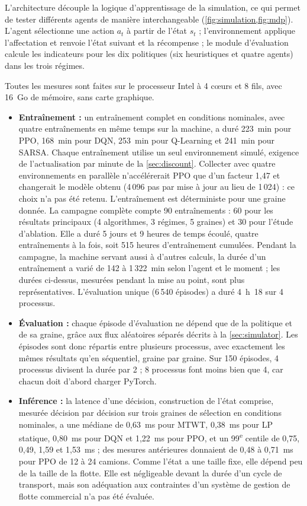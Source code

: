 \documentclass[11pt,a4paper]{article}
\newif\ifrevmarks
\newcommand{\revtag}[1]{\ifrevmarks\textsuperscript{\textcolor{red!70!black}{\scriptsize[#1]}}\fi}
\newcommand{\rev}[2]{\ifrevmarks{\color{revcolor}#2}\revtag{#1}\else#2\fi}
\newenvironment{revbloc}[1]{\par\ifrevmarks\color{revcolor}\noindent\revtag{#1}\ \fi}{\par}
\newif\ifcorrmarks
\newcommand{\corr}[1]{\ifcorrmarks\textcolor{corrcolor}{#1}\else#1\fi}
\begin{document}
L'architecture découple la logique d'apprentissage de la simulation, ce qui permet de tester différents agents de manière interchangeable (\cref{fig:simulation,fig:mdp}). L'agent sélectionne une action $a_t$ à partir de l'état $s_t$ ; l'environnement applique l'affectation et renvoie l'état suivant et la récompense ; le module d'évaluation calcule les indicateurs pour \rev{v3}{les dix politiques (six heuristiques et quatre agents)} dans les trois régimes.

\begin{revbloc}{M28, m20, m24, v3}
Toutes les mesures sont faites sur le \corr{processeur Intel à 4 cœurs et 8 fils, avec 16~Go de mémoire}, sans carte graphique.
\begin{itemize}
  \item \textbf{Entraînement :} un entraînement complet en conditions nominales, avec quatre entraînements en même temps sur la machine, a duré 223~min pour PPO, 168~min pour DQN, 253~min pour Q-Learning et 241~min pour SARSA. Chaque entraînement utilise un seul environnement simulé, exigence de l'actualisation par minute de la \cref{sec:discount}. Collecter avec quatre environnements en parallèle n'accélérerait PPO que d'un facteur 1,47 et changerait le modèle obtenu (4\,096 pas par mise à jour au lieu de 1\,024) : ce choix n'a pas été retenu. L'entraînement est déterministe pour une graine donnée. \rev{T31}{La campagne complète compte 90 entraînements : 60 pour les résultats principaux (4 algorithmes, 3 régimes, 5 graines) et 30 pour l'étude d'ablation. Elle a duré \corr{5 jours et 9 heures de temps écoulé}, quatre entraînements à la fois, soit 515 heures d'entraînement cumulées. Pendant la campagne, la machine servant aussi à d'autres calculs, la durée d'un entraînement a varié de 142 à 1\,322~min selon l'agent et le moment ; les durées ci-dessus, mesurées pendant la mise au point, sont plus représentatives. L'évaluation unique (6\,540 épisodes) a duré 4~h~18 sur 4 processus.}
  \item \textbf{Évaluation :} chaque épisode d'évaluation ne dépend que de la politique et de sa graine, grâce aux flux aléatoires séparés décrits à la \cref{sec:simulator}. Les épisodes sont donc répartis entre plusieurs processus, avec exactement les mêmes résultats qu'en séquentiel, graine par graine. Sur 150 épisodes, 4 processus divisent la durée par 2 ; 8 processus font moins bien que 4, car chacun doit d'abord charger PyTorch.
  \item \textbf{Inférence :} \corr{la latence d'une décision, construction de l'état comprise, mesurée décision par décision sur trois graines de sélection en conditions nominales, a une médiane de 0,63~ms pour MTWT, 0,38~ms pour \corr{LP statique}, 0,80~ms pour DQN et 1,22~ms pour PPO, et un 99\textsuperscript{e} centile de 0,75, 0,49, 1,59 et 1,53~ms ; des mesures antérieures donnaient de 0,48 à 0,71~ms pour PPO de 12 à 24 camions.} Comme l'état a une taille fixe, elle dépend peu de la taille de la flotte. Elle est négligeable devant la durée d'un cycle de transport, mais son adéquation aux contraintes d'un système de gestion de flotte commercial n'a pas été évaluée.

\end{itemize}
\end{revbloc}
\end{document}
